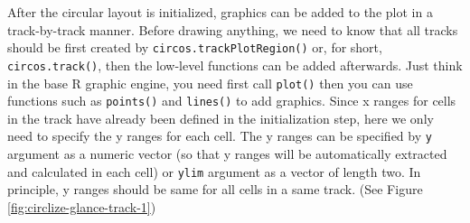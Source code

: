 \documentclass[]{book}
\newenvironment{Shaded}{\begin{snugshade}}{\end{snugshade}}
\newcommand{\KeywordTok}[1]{\textcolor[rgb]{0.13,0.29,0.53}{\textbf{#1}}}
\newcommand{\DataTypeTok}[1]{\textcolor[rgb]{0.13,0.29,0.53}{#1}}
\newcommand{\DecValTok}[1]{\textcolor[rgb]{0.00,0.00,0.81}{#1}}
\newcommand{\FloatTok}[1]{\textcolor[rgb]{0.00,0.00,0.81}{#1}}
\newcommand{\StringTok}[1]{\textcolor[rgb]{0.31,0.60,0.02}{#1}}
\newcommand{\ControlFlowTok}[1]{\textcolor[rgb]{0.13,0.29,0.53}{\textbf{#1}}}
\newcommand{\OperatorTok}[1]{\textcolor[rgb]{0.81,0.36,0.00}{\textbf{#1}}}
\newcommand{\NormalTok}[1]{#1}
\theoremstyle{definition}
\theoremstyle{definition}
\theoremstyle{remark}
\begin{document}
After the circular layout is initialized, graphics can be added to the
plot in a track-by-track manner. Before drawing anything, we need to
know that all tracks should be first created by
\texttt{circos.trackPlotRegion()} or, for short,
\texttt{circos.track()}, then the low-level functions can be added
afterwards. Just think in the base R graphic engine, you need first call
\texttt{plot()} then you can use functions such as \texttt{points()} and
\texttt{lines()} to add graphics. Since x ranges for cells in the track
have already been defined in the initialization step, here we only need
to specify the y ranges for each cell. The y ranges can be specified by
\texttt{y} argument as a numeric vector (so that y ranges will be
automatically extracted and calculated in each cell) or \texttt{ylim}
argument as a vector of length two. In principle, y ranges should be
same for all cells in a same track. (See Figure
\ref{fig:circlize-glance-track-1})

\begin{Shaded}
\end{Shaded}
\end{document}

